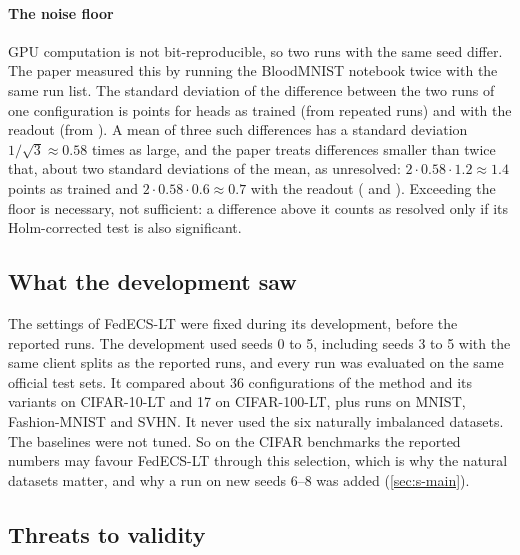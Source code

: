 \paragraph{The noise floor} GPU computation is not bit-reproducible, so two runs with the same seed differ. The paper
measured this by running the BloodMNIST notebook twice with the same run list. The standard deviation of the
difference between the two runs of one configuration is  points for heads as trained (from
 repeated runs) and  with the readout (from ). A mean of three such
differences has a standard deviation $1/\sqrt3\approx0.58$ times as large, and the paper treats differences smaller
than twice that, about two standard deviations of the mean, as unresolved: $2\cdot0.58\cdot1.2\approx1.4$ points as
trained and $2\cdot0.58\cdot0.6\approx0.7$ with the readout ( and ). Exceeding the floor is necessary, not sufficient: a difference above it counts as
resolved only if its Holm-corrected test is also significant.

\subsection{What the development saw}\label{sec:s-development}

The settings of FedECS-LT were fixed during its development, before the reported runs. The development used seeds 0 to
5, including seeds 3 to 5 with the same client splits as the reported runs, and every run was evaluated on the same
official test sets. It compared about 36 configurations of the method and its variants on CIFAR-10-LT and 17 on
CIFAR-100-LT, plus runs on MNIST, Fashion-MNIST and SVHN. It never used the six naturally imbalanced datasets. The
baselines were not tuned. So on the CIFAR benchmarks the reported numbers may favour FedECS-LT through this selection,
which is why the natural datasets matter, and why a run on new seeds 6--8 was added (\cref{sec:s-main}).

\subsection{Threats to validity}


